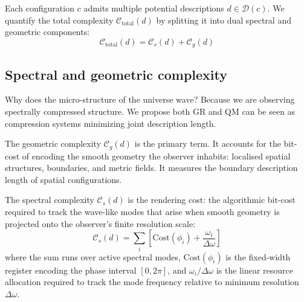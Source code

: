 \documentclass[12pt,a4paper]{article}
\newcommand{\Cs}{\mathcal{C}_s}
\newcommand{\Cg}{\mathcal{C}_g}
\newcommand{\Ctotal}{\mathcal{C}_{\mathrm{total}}}
\begin{document}
Each configuration $c$ admits multiple potential descriptions
$d \in \mathcal{D}(c)$. We quantify the total complexity $\Ctotal(d)$ by
splitting it into dual spectral and geometric components:
\begin{equation}
\Ctotal(d) = \Cs(d) + \Cg(d)
\end{equation}

\subsection*{Spectral and geometric complexity}

Why does the micro-structure of the universe wave? Because we are observing
spectrally compressed structure. We propose both GR and QM can be seen
as compression systems minimizing joint description length.

The geometric complexity $\Cg(d)$ is the primary term. It accounts for the
bit-cost of encoding the smooth geometry the observer inhabits: localised
spatial structures, boundaries, and metric fields. It measures the boundary
description length of spatial configurations.

The spectral complexity $\Cs(d)$ is the rendering cost: the algorithmic
bit-cost required to track the wave-like modes that arise when smooth geometry
is projected onto the observer's finite resolution scale:
\begin{equation}
\Cs(d) = \sum_i \left[
  \mathrm{Cost}(\phi_i) +
  \frac{\omega_i}{\Delta\omega}
\right]
\end{equation}
where the sum runs over active spectral modes, $\mathrm{Cost}(\phi_i)$ is the
fixed-width register encoding the phase interval $[0, 2\pi]$, and
$\omega_i/\Delta\omega$ is the linear resource allocation required to track the
mode frequency relative to minimum resolution $\Delta\omega$.
\end{document}

